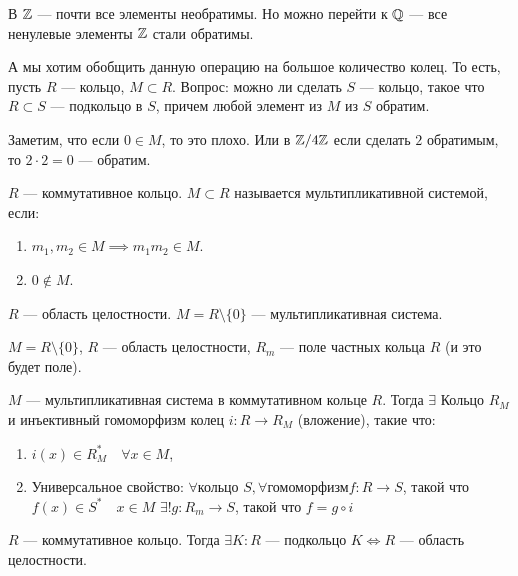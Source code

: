В $\mathbb{Z}$ --- почти все элементы необратимы. Но можно перейти к  $\mathbb{Q}$ --- все ненулевые элементы  $\mathbb{Z}$ стали обратимы.

А мы хотим обобщить данную операцию на большое количество колец. То есть, пусть  $R$ --- кольцо,  $M \subset R$. Вопрос: можно ли сделать  $S$ --- кольцо, такое что  $R \subset S$ --- подкольцо в  $S$, причем любой элемент из  $M$ из  $S$ обратим.  

Заметим, что если $0 \in M$, то это плохо. Или в  $\mathbb{Z} / 4\mathbb{Z}$ если сделать $2$ обратимым, то  $2 \cdot 2 = 0$ --- обратим. 

\begin{definition}
    $R$ --- коммутативное кольцо.  $M \subset R$ называется мультипликативной системой, если:
     \begin{enumerate}
         \item $m_1, m_2 \in M \implies m_1m_2 \in M$.
         \item $0 \notin M$.
    \end{enumerate}
\end{definition}
\begin{example}
    $R$ --- область целостности.  $M = R \setminus \{0\}$ --- мультипликативная система.
\end{example}
\begin{definition}
    $M = R \setminus \{ 0\}$,  $R$ --- область целостности,  $R_m$ --- поле частных кольца  $R$ (и это будет поле).
\end{definition}
\begin{theorem}
    $M$ --- мультипликативная система в коммутативном кольце  $R$. Тогда  $\exists$ Кольцо  $R_M$ и инъективный гомоморфизм колец  $i\!: R \to R_M$ (вложение), такие что:
     \begin{enumerate}
         \item $i(x) \in R^*_M \quad \forall x \in M$,
         \item  Универсальное свойство:  $\forall \text{кольцо } S, \forall \text{гомоморфизм} f\!: R \to S$, такой что  $f(x) \in S^* \quad x \in M$  $\exists! g\!: R_m \to S$, такой что  $f = g \circ i$
    \end{enumerate}
\end{theorem}
\begin{remark}
    $R$ --- коммутативное кольцо. Тогда  $\exists K\!: R$ --- подкольцо  $K \iff R$ ---  область целостности.
\end{remark}
